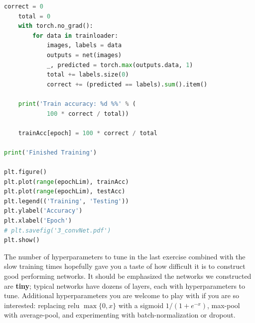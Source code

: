 \documentclass{article}
\newcommand{\1}{\mathbf{1}}
\begin{document}
\begin{lstlisting}[language=Python]
    correct = 0
    total = 0
    with torch.no_grad():
        for data in trainloader:
            images, labels = data
            outputs = net(images)
            _, predicted = torch.max(outputs.data, 1)
            total += labels.size(0)
            correct += (predicted == labels).sum().item()

    print('Train accuracy: %d %%' % (
            100 * correct / total))

    trainAcc[epoch] = 100 * correct / total

print('Finished Training')

plt.figure()
plt.plot(range(epochLim), trainAcc)
plt.plot(range(epochLim), testAcc)
plt.legend(('Training', 'Testing'))
plt.ylabel('Accuracy')
plt.xlabel('Epoch')
# plt.savefig('3_convNet.pdf')
plt.show()

\end{lstlisting}
The number of hyperparameters to tune in the last exercise combined with the slow training times hopefully gave you a taste of how difficult it is to construct good performing networks. 
It should be emphasized the networks we constructed are \textbf{tiny}; typical networks have dozens of layers, each with hyperparameters to tune. 
Additional hyperparameters you are welcome to play with if you are so interested: replacing relu $\max\{0,x\}$ with a sigmoid $1/(1+e^{-x})$, max-pool with average-pool, and experimenting with batch-normalization or dropout.
\end{document}
